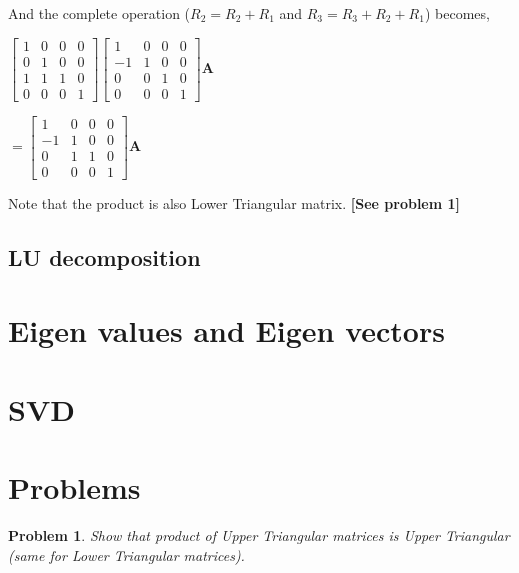 \documentclass[a4paper]{article}
\newtheorem{problem}{Problem}
\begin{document}
            And the complete operation ($R_2 = R_2 + R_1$ and $R_3 = R_3 + R_2 + R_1$) becomes,
            
            \begin{center}
                $
                    \begin{bmatrix}
                    1  & 0 & 0 & 0 \\
                    0  & 1 & 0 & 0 \\
                    1  & 1 & 1 & 0 \\
                    0  & 0 & 0 & 1 
                    \end{bmatrix}
                    \begin{bmatrix}
                    1  & 0 & 0 & 0 \\
                    -1 & 1 & 0 & 0 \\
                    0  & 0 & 1 & 0 \\
                    0  & 0 & 0 & 1 
                    \end{bmatrix}
                    \mathbf{A}
                    $
                    
                    $
                    =
                    \begin{bmatrix}
                    1  & 0 & 0 & 0 \\
                    -1 & 1 & 0 & 0 \\
                    0  & 1 & 1 & 0 \\
                    0  & 0 & 0 & 1 
                    \end{bmatrix}
                    \mathbf{A}
                $
            \end{center}
            
            Note that the product is also Lower Triangular matrix. \textbf{[See problem 1]}
            
    \subsection{LU decomposition}
        
            
\section{Eigen values and Eigen vectors}

\section{SVD}

\section{Problems}

\begin{problem}
    Show that product of Upper Triangular matrices is Upper Triangular (same for Lower Triangular matrices).
\end{problem}
\end{document}
